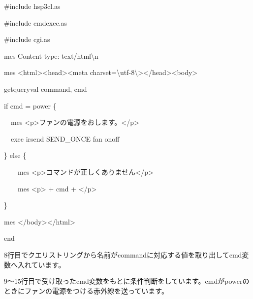\documentclass[a4paper,12pt,dvipdfmx]{jarticle}
\begin{document}
\bigskip

\bigskip



\centering
\begin{boxedminipage}{16.36cm}
	\#include {\textquotedbl}hsp3cl.as{\textquotedbl}

	\#include {\textquotedbl}cmdexec.as{\textquotedbl}

	\#include {\textquotedbl}cgi.as{\textquotedbl}


	\bigskip

	mes {\textquotedbl}Content-type: text/html{\textbackslash}n{\textquotedbl}

	mes {\textquotedbl}{\textless}html{\textgreater}{\textless}head{\textgreater}{\textless}meta
	charset={\textbackslash}{\textquotedbl}utf-8{\textbackslash}{\textquotedbl}{\textgreater}{\textless}/head{\textgreater}{\textless}body{\textgreater}{\textquotedbl}


	\bigskip

	getqueryval {\textquotedbl}command{\textquotedbl}, cmd

	if cmd = {\textquotedbl}power{\textquotedbl} \{

	\ \ mes
		{\textquotedbl}{\textless}p{\textgreater}ファンの電源をおします。{\textless}/p{\textgreater}{\textquotedbl}

	\ \ exec {\textquotedbl}irsend SEND\_ONCE fan onoff{\textquotedbl}

	\} else \{

	\ \ \ \ mes
		{\textquotedbl}{\textless}p{\textgreater}コマンドが正しくありません{\textless}/p{\textgreater}{\textquotedbl}

	\ \ \ \ mes {\textquotedbl}{\textless}p{\textgreater}{\textquotedbl} + cmd +
	{\textquotedbl}{\textless}/p{\textgreater}{\textquotedbl}

	\}


	\bigskip

	mes {\textquotedbl}{\textless}/body{\textgreater}{\textless}/html{\textgreater}{\textquotedbl}

	end
\end{boxedminipage}
\flushleft

\bigskip




\bigskip


\bigskip

8行目でクエリストリングから名前がcommandに対応する値を取り出してcmd変数へ入れています。

9〜15行目で受け取ったcmd変数をもとに条件判断をしています。cmdがpowerのときにファンの電源をつける赤外線を送っています。
\end{document}
